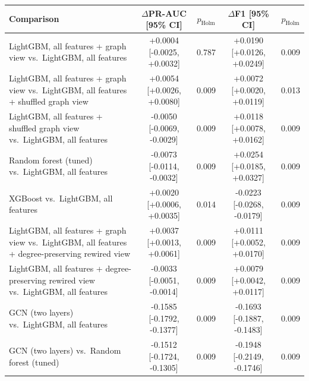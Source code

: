 \begin{tabular}{lcccc}
\toprule
Comparison & $\Delta$PR-AUC [95\% CI] & $p_{\mathrm{Holm}}$ & $\Delta$F1 [95\% CI] & $p_{\mathrm{Holm}}$ \\
\midrule
LightGBM, all features + graph view vs.\ LightGBM, all features & +0.0004 [-0.0025, +0.0032] & 0.787 & +0.0190 [+0.0126, +0.0249] & 0.009 \\
LightGBM, all features + graph view vs.\ LightGBM, all features + shuffled graph view & +0.0054 [+0.0026, +0.0080] & 0.009 & +0.0072 [+0.0020, +0.0119] & 0.013 \\
LightGBM, all features + shuffled graph view vs.\ LightGBM, all features & -0.0050 [-0.0069, -0.0029] & 0.009 & +0.0118 [+0.0078, +0.0162] & 0.009 \\
Random forest (tuned) vs.\ LightGBM, all features & -0.0073 [-0.0114, -0.0032] & 0.009 & +0.0254 [+0.0185, +0.0327] & 0.009 \\
XGBoost vs.\ LightGBM, all features & +0.0020 [+0.0006, +0.0035] & 0.014 & -0.0223 [-0.0268, -0.0179] & 0.009 \\
LightGBM, all features + graph view vs.\ LightGBM, all features + degree-preserving rewired view & +0.0037 [+0.0013, +0.0061] & 0.009 & +0.0111 [+0.0052, +0.0170] & 0.009 \\
LightGBM, all features + degree-preserving rewired view vs.\ LightGBM, all features & -0.0033 [-0.0051, -0.0014] & 0.009 & +0.0079 [+0.0042, +0.0117] & 0.009 \\
GCN (two layers) vs.\ LightGBM, all features & -0.1585 [-0.1792, -0.1377] & 0.009 & -0.1693 [-0.1887, -0.1483] & 0.009 \\
GCN (two layers) vs.\ Random forest (tuned) & -0.1512 [-0.1724, -0.1305] & 0.009 & -0.1948 [-0.2149, -0.1746] & 0.009 \\
\bottomrule
\end{tabular}
